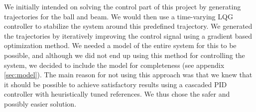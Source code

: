 We initially intended on solving the control part of this project by generating trajectories for the ball and beam.
We would then use a time-varying LQG controller to stabilize the system around this predefined trajectory.
We generated the trajectories by iteratively improving the control signal using a gradient based optimization method.
We needed a model of the entire system for this to be possible, and although we did not end up using this method for controlling the system, we decided to include the model for completeness (see appendix \ref{sec:model}).
The main reason for not using this approach was that we knew that it should be possible to achieve satisfactory results using a cascaded PID controller with heuristically tuned references.
We thus chose the safer and possibly easier solution.
